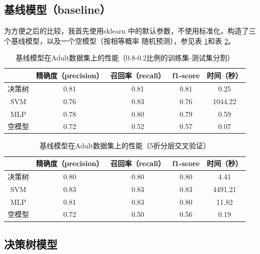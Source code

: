\documentclass[12pt,a4paper]{article}
\theoremstyle{definition}
\begin{document}
\subsection{基线模型（baseline）}

为方便之后的比较，我首先使用sklearn \cite{sklearn}中的默认参数，不使用标准化，构造了三个基线模型，以及一个空模型（按相等概率 随机预测），参见表 \ref{tab:baselines1}和表 \ref{tab:baselines2}。

\begin{table}[H]
	\renewcommand\arraystretch{1.35}
	\caption{基线模型在Adult数据集上的性能（0.8-0.2比例的训练集-测试集分割）}
	\label{tab:baselines1}
	\centering
	
	\begin{tabular}{c|c|c|c|c}
		\centering
		 & 精确度（precision） & 召回率（recall） & f1-score & 时间（秒） \\
		\hline
		\hline
		
		决策树 & 0.81 & 0.81 & 0.81 & 0.25 \\
		SVM & 0.76 & 0.83 & 0.76 & 1044.22 \\
		MLP & 0.78 & 0.80 & 0.79 & 0.59 \\
		空模型 & 0.72 & 0.52 & 0.57 & 0.07 \\

	\end{tabular}
\end{table}

\begin{table}[H]
	\renewcommand\arraystretch{1.35}
	\caption{基线模型在Adult数据集上的性能（5折分层交叉验证）}
	\label{tab:baselines2}
	\centering
	
	\begin{tabular}{c|c|c|c|c}
		\centering
		 & 精确度（precision） & 召回率（recall） & f1-score & 时间（秒） \\
		\hline
		\hline
		
		决策树 & 0.80 & 0.80 & 0.80 & 4.41 \\
		SVM & 0.83 & 0.83 & 0.83 & 4491.21 \\
		MLP & 0.81 & 0.83 & 0.80 & 11.82 \\
		空模型 & 0.72 & 0.50 & 0.56 & 0.19 \\

	\end{tabular}
\end{table}

\subsection{决策树模型}
\end{document}
